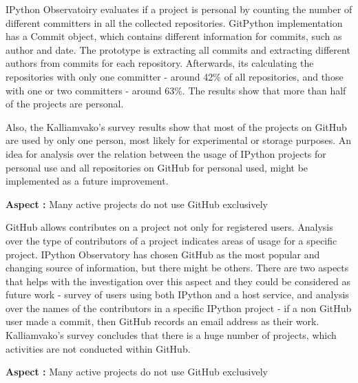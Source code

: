 IPython Observatoiry evaluates if a project is personal by counting the number of different committers in all the collected repositories. GitPython implementation has a Commit object, which contains different information for commits, such as author and date. The prototype is extracting all commits and extracting different authors from commits for each repository. Afterwards, its calculating the repositories with only one committer - around 42\% of all repositories, and those with one or two committers - around 63\%. The results show that more than half of the projects are personal. 

Also, the Kalliamvako's survey\cite{kalliamvakoupromises} results show that most of the projects on GitHub are used by only one person, most likely for experimental or storage purposes. An idea for analysis over the relation between the usage of IPython projects for personal use and all repositories on GitHub for personal used, might be implemented as a future improvement.


\vspace{5mm}
\begin{mdframed}
\vspace{1px}
\textbf{Aspect :}  Many active projects do not use GitHub exclusively
\vspace{1px}
\end{mdframed}
\vspace{2mm}

GitHub allows contributes on a project not only for registered users. Analysis over the type of contributors of a project indicates areas of usage for a specific project. IPython Observatory has chosen GitHub as the most popular and changing source of information, but there might be others. There are two aspects that helps with the investigation over this aspect and they could be considered as future work - survey of users using both IPython and a host service, and analysis over the names of the contributors in a specific IPython project - if a non GitHub user made a commit, then GitHub records an email address as their work\cite{kalliamvakoupromises}. Kalliamvako's survey\cite{kalliamvakoupromises} concludes that there is a huge number of projects, which activities are not conducted within GitHub.

\vspace{5mm}
\begin{mdframed}
\vspace{1px}
\textbf{Aspect :}  Many active projects do not use GitHub exclusively
\vspace{1px}
\end{mdframed}
\vspace{2mm}

